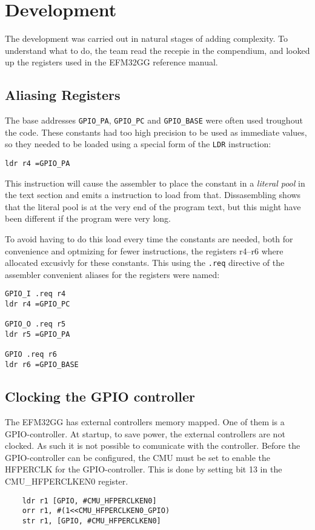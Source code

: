 \section{Development}
The development was carried out in natural stages of adding complexity.
To understand what to do, the team read the recepie in the compendium, and looked up the registers used in the EFM32GG reference manual.

\subsection{Aliasing Registers}
The base addresses \texttt{GPIO\_PA}, \texttt{GPIO\_PC} and \texttt{GPIO\_BASE} were often used troughout the code.
These constants had too high precision to be used as immediate values, so they needed to be loaded using a special form of the \texttt{LDR} instruction:

\begin{verbatim}
ldr r4 =GPIO_PA
\end{verbatim}

This instruction will cause the assembler to place the constant in a \emph{literal pool} in the text section and emits a instruction to load from that.
Dissasembling shows that the literal pool is at the very end of the program text, but this might have been different if the program were very long.

To avoid having to do this load every time the constants are needed, both for convenience and optmizing for fewer instructions, the registers r4--r6 where allocated excusivly for these constants.
This using the \texttt{.req} directive of the assembler convenient aliases for the registers were named:

\begin{verbatim}
GPIO_I .req r4
ldr r4 =GPIO_PC

GPIO_O .req r5
ldr r5 =GPIO_PA

GPIO .req r6
ldr r6 =GPIO_BASE
\end{verbatim}


\subsection{Clocking the GPIO controller}
The EFM32GG has external controllers memory mapped.
One of them is a GPIO-controller.
At startup, to save power, the external controllers are not clocked.
As such it is not possible to comunicate with the controller.
Before the GPIO-controller can be configured, the CMU must be set to enable the HFPERCLK for the GPIO-controller.
This is done by setting bit 13 in the CMU\_HFPERCLKEN0 register.

\begin{verbatim}
    ldr r1 [GPIO, #CMU_HFPERCLKEN0]
    orr r1, #(1<<CMU_HFPERCLKEN0_GPIO)
    str r1, [GPIO, #CMU_HFPERCLKEN0]
\end{verbatim}
